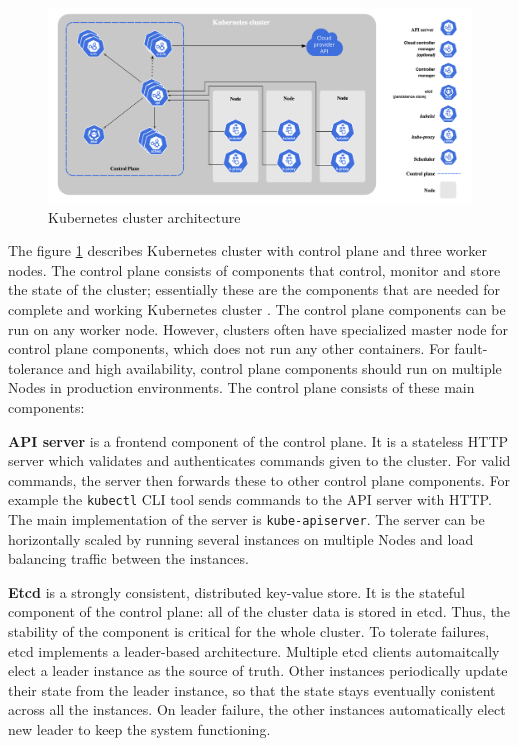 \documentclass[english, 12pt, a4paper, sci, utf8, a-2b, online]{aaltothesis}
\begin{document}
\begin{figure}[h!]
  \centering
  \includegraphics[width=\linewidth]{files/k8s-arch.png}
  \caption{Kubernetes cluster architecture \cite{k8s-docs-control-plane}}
  \label{figure-2}
\end{figure}

The figure \ref{figure-2} describes Kubernetes cluster with control plane and three worker nodes. The control plane consists of components that control, monitor and store the state of the cluster; essentially these are the components that are needed for complete and working Kubernetes cluster \cite{k8s-docs-control-plane}. The control plane components can be run on any worker node. However, clusters often have specialized master node for control plane components, which does not run any other containers. For fault-tolerance and high availability, control plane components should run on multiple Nodes in production environments. The control plane consists of these main components:

\textbf{API server} is a frontend component of the control plane. It is a stateless HTTP server which validates and authenticates commands given to the cluster. For valid commands, the server then forwards these to other control plane components. For example the \texttt{kubectl} CLI tool sends commands to the API server with HTTP. The main implementation of the server is \texttt{kube-apiserver}. The server can be horizontally scaled by running several instances on multiple Nodes and load balancing traffic between the instances.

\textbf{Etcd} \cite{etcd} is a strongly consistent, distributed key-value store. It is the stateful component of the control plane: all of the cluster data is stored in etcd. Thus, the stability of the component is critical for the whole cluster. To tolerate failures, etcd implements a leader-based architecture. Multiple etcd clients automaitcally elect a leader instance as the source of truth. Other instances periodically update their state from the leader instance, so that the state stays eventually conistent across all the instances. On leader failure, the other instances automatically elect new leader to keep the system functioning.
\end{document}
